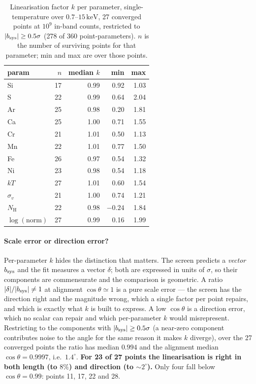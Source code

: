 \documentclass[11pt,a4paper]{article}
\newcommand{\nh}{N_{\mathrm{H}}}
\newcommand{\kev}{\,\mathrm{keV}}
\begin{document}
\begin{table}[htbp]
\centering
\caption{Linearisation factor $k$ per parameter, single-temperature over
$0.7$--$15\kev$, 27 converged points at $10^9$ in-band counts, restricted to
$|b_{\rm sys}|\ge0.5\sigma$ (278 of 360 point-parameters). $n$ is the number of
surviving points for that parameter; min and max are over those points.}
\label{tab:kwide}
\begin{tabular}{lrrrr}
\toprule
param & $n$ & median $k$ & min & max \\
\midrule
Si                  & 17 & 0.99 &  0.92 & 1.03 \\
S                   & 22 & 0.99 &  0.64 & 2.04 \\
Ar                  & 25 & 0.98 &  0.20 & 1.81 \\
Ca                  & 25 & 1.00 &  0.71 & 1.55 \\
Cr                  & 21 & 1.01 &  0.50 & 1.13 \\
Mn                  & 22 & 1.01 &  0.77 & 1.50 \\
Fe                  & 26 & 0.97 &  0.54 & 1.32 \\
Ni                  & 23 & 0.98 &  0.54 & 1.18 \\
$kT$                & 27 & 1.01 &  0.60 & 1.54 \\
$\sigma_v$          & 21 & 1.00 &  0.74 & 1.21 \\
$\nh$               & 22 & 0.98 & $-0.24$ & 1.84 \\
$\log(\text{norm})$ & 27 & 0.99 &  0.16 & 1.99 \\
\bottomrule
\end{tabular}
\end{table}

\paragraph{Scale error or direction error?} Per-parameter $k$ hides the
distinction that matters. The screen predicts a \emph{vector} $b_{\rm sys}$ and
the fit measures a vector $\delta$; both are expressed in units of $\sigma$, so
their components are commensurate and the comparison is geometric. A ratio
$|\delta|/|b_{\rm sys}|\neq1$ at alignment $\cos\theta\simeq1$ is a pure scale
error --- the screen has the direction right and the magnitude wrong, which a
single factor per point repairs, and which is exactly what $k$ is built to
express. A low $\cos\theta$ is a direction error, which no scalar can repair
and which per-parameter $k$ would misrepresent. Restricting to the components
with $|b_{\rm sys}|\ge0.5\sigma$ (a near-zero component contributes noise to
the angle for the same reason it makes $k$ diverge), over the 27 converged
points the ratio has median $0.994$ and the alignment median
$\cos\theta=0.9997$, i.e.\ $1.4^\circ$. \textbf{For 23 of 27 points the
linearisation is right in both length (to $8\%$) and direction (to
${\sim}2^\circ$).} Only four fall below $\cos\theta=0.99$: points 11, 17, 22
and 28.
\end{document}

